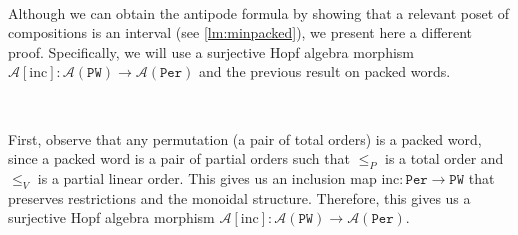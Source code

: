 \documentclass[12pt, reqno]{amsart}
\theoremstyle{definition}
\begin{document}
\

Although we can obtain the antipode formula by showing that a relevant poset of compositions is an interval (see \cref{lm:minpacked}), we present here a different proof.
Specifically, we will use a surjective Hopf algebra morphism $\mathcal A[\mathrm{inc}]: \mathcal A(\mathtt{PW}) \to \mathcal A(\mathtt{Per})$ and the previous result on packed words.

\

First, observe that any permutation (a pair of total orders) is a packed word, since a packed word is a pair of partial orders such that $\leq_P$ is a total order and $\leq_V$ is a partial linear order.
This gives us an inclusion map $\mathrm{inc} : \mathtt{Per} \to \mathtt{PW}$ that preserves restrictions and the monoidal structure.
Therefore, this gives us a surjective Hopf algebra morphism $\mathcal A[\mathrm{inc}]: \mathcal A(\mathtt{PW}) \to \mathcal A(\mathtt{Per})$.
\end{document}
